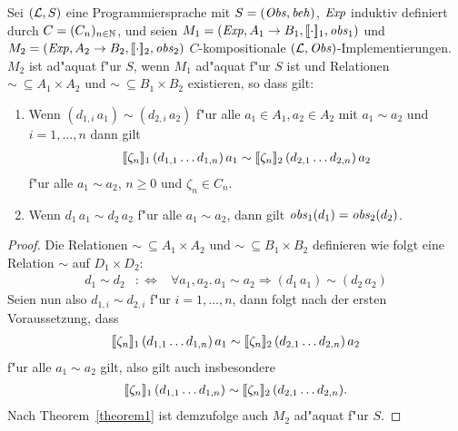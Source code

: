 \documentclass[12pt,a4paper]{article}
\begin{document}
\begin{theorem}
  Sei $(\mathcal L,S)$ eine Programmiersprache mit $S = (\mathit{Obs},\mathit{beh})$, $\mathit{Exp}$ induktiv definiert durch
  $C = (C_n)_{n\in\mathbb N}$, und seien $M_1 = (\mathit{Exp},A_1 \to B_1,[\![\cdot]\!]_1,\mathit{obs}_1)$ und
  $M_2 = (\mathit{Exp},A_2 \to B_2,[\![\cdot]\!]_2,\mathit{obs}_2)$ $C$-kompositionale $(\mathcal L,\mathit{Obs})$-Implementierungen.
  $M_2$ ist ad"aquat f"ur $S$, wenn $M_1$ ad"aquat f"ur $S$ ist und Relationen
  $\sim\ \subseteq A_1 \times A_2$ und $\sim\ \subseteq B_1 \times B_2$ existieren, so dass gilt:
  \begin{enumerate}
  \item Wenn $(d_{1,i}\,a_1) \sim (d_{2,i}\,a_2)$ f"ur alle $a_1 \in A_1,a_2 \in A_2$ mit
    $a_1 \sim a_2$ und $i = 1,\ldots,n$ dann gilt
    \[\begin{array}{c}
      [\![\zeta_n]\!]_1\,(d_{1,1} \ldots d_{1,n})\,a_1
      \sim
      [\![\zeta_n]\!]_2\,(d_{2,1} \ldots d_{2,n})\,a_2
    \end{array}\]
    f"ur alle $a_1 \sim a_2$, $n \ge 0$ und $\zeta_n \in C_n$.
  \item Wenn $d_1\,a_1 \sim d_2\,a_2$ f"ur alle $a_1 \sim a_2$, dann gilt
    $\mathit{obs}_1(d_1) = \mathit{obs}_2(d_2)$.
  \end{enumerate}
\end{theorem}

\begin{proof}
  Die Relationen $\sim\ \subseteq A_1 \times A_2$ und $\sim\ \subseteq B_1 \times B_2$ definieren
  wie folgt eine Relation $\sim$ auf $D_1 \times D_2$:
  \[\begin{array}{rcl}
    d_1 \sim d_2
    &:\Leftrightarrow&
    \forall a_1,a_2.\,a_1 \sim a_2 \Rightarrow (d_1\,a_1) \sim (d_2\,a_2)
  \end{array}\]
  Seien nun also $d_{1,i} \sim d_{2,i}$ f"ur $i=1,\ldots,n$, dann folgt nach der ersten Voraussetzung, dass
  \[\begin{array}{c}
      [\![\zeta_n]\!]_1\,(d_{1,1} \ldots d_{1,n})\,a_1
      \sim
      [\![\zeta_n]\!]_2\,(d_{2,1} \ldots d_{2,n})\,a_2
  \end{array}\]
  f"ur alle $a_1 \sim a_2$ gilt, also gilt auch insbesondere
  \[\begin{array}{c}
      [\![\zeta_n]\!]_1\,(d_{1,1} \ldots d_{1,n})
      \sim
      [\![\zeta_n]\!]_2\,(d_{2,1} \ldots d_{2,n}).
  \end{array}\]
  Nach Theorem~\ref{theorem1} ist demzufolge auch $M_2$ ad"aquat f"ur $S$.
\end{proof}
\end{document}
